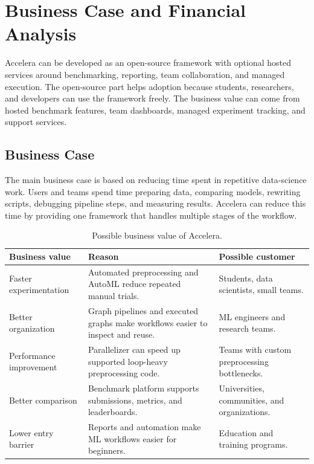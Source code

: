 \documentclass[12pt,a4paper]{report}
\newcommand{\acceleraTableStyle}{%
\small
\renewcommand{\arraystretch}{1.15}
\setlength{\tabcolsep}{4pt}%
}
\begin{document}
\section{Business Case and Financial Analysis}

Accelera can be developed as an open-source framework with optional hosted
services around benchmarking, reporting, team collaboration, and managed
execution. The open-source part helps adoption because students, researchers,
and developers can use the framework freely. The business value can come from
hosted benchmark features, team dashboards, managed experiment tracking, and
support services.

\subsection{Business Case}

The main business case is based on reducing time spent in repetitive
data-science work. Users and teams spend time preparing data, comparing models,
rewriting scripts, debugging pipeline steps, and measuring results. Accelera can
reduce this time by providing one framework that handles multiple stages of the
workflow.

\begin{table}[!htbp]
\centering
\acceleraTableStyle
\caption{Possible business value of Accelera.}
\label{tab:business-value}
\begin{tabular}{p{}p{}p{}}
\toprule
\textbf{Business value} & \textbf{Reason} & \textbf{Possible customer} \\
\midrule

Faster experimentation &
Automated preprocessing and AutoML reduce repeated manual trials. &
Students, data scientists, small teams. \\
\midrule

Better organization &
Graph pipelines and executed graphs make workflows easier to inspect and reuse. &
ML engineers and research teams. \\
\midrule

Performance improvement &
Parallelizer can speed up supported loop-heavy preprocessing code. &
Teams with custom preprocessing bottlenecks. \\
\midrule

Better comparison &
Benchmark platform supports submissions, metrics, and leaderboards. &
Universities, communities, and organizations. \\
\midrule

Lower entry barrier &
Reports and automation make ML workflows easier for beginners. &
Education and training programs. \\

\bottomrule
\end{tabular}
\end{table}
\end{document}
